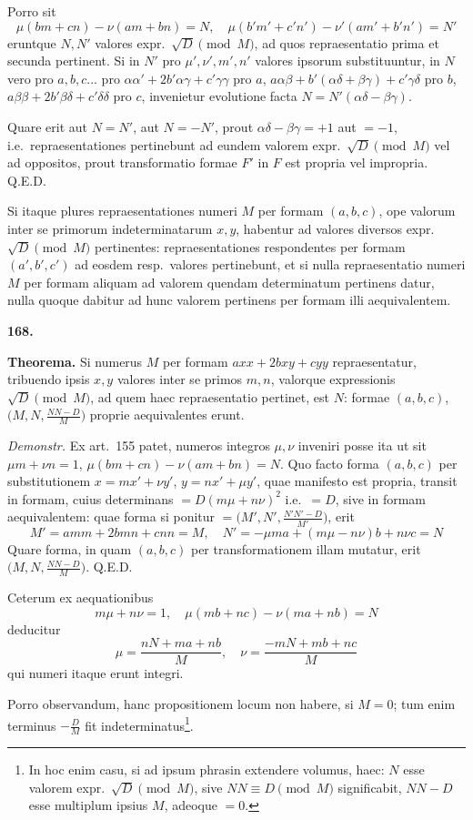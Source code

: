 \documentclass[12pt,a4paper]{article}
\theoremstyle{plain}
\theoremstyle{definition}
\theoremstyle{remark}
\newcommand{\qeode}{\textsc{Q.E.D.}}
\begin{document}
Porro sit
\[\mu(bm+cn)-\nu(am+bn)=N,\quad \mu(b'm'+c'n')-\nu'(am'+b'n')=N'\]
eruntque $N,N'$ valores expr.\ $\sqrt{D}\pmod{M}$, ad quos repraesentatio prima et secunda pertinent. Si in $N'$ pro $\mu',\nu',m',n'$ valores ipsorum substituuntur, in $N$ vero pro $a,b,c$...
pro $\alpha\alpha'+2b'\alpha\gamma+c'\gamma\gamma$ pro $a$, $a\alpha\beta+b'(\alpha\delta+\beta\gamma)+c'\gamma\delta$ pro $b$, $a\beta\beta+2b'\beta\delta+c'\delta\delta$ pro $c$, invenietur evolutione facta $N=N'(\alpha\delta-\beta\gamma)$.

Quare erit aut $N=N'$, aut $N=-N'$, prout $\alpha\delta-\beta\gamma=+1$ aut $=-1$, i.e.\ repraesentationes pertinebunt ad eundem valorem expr.\ $\sqrt{D}\pmod{M}$ vel ad oppositos, prout transformatio formae $F'$ in $F$ est propria vel impropria. \qeode

Si itaque plures repraesentationes numeri $M$ per formam $(a,b,c)$, ope valorum inter se primorum indeterminatarum $x,y$, habentur ad valores diversos expr.\ $\sqrt{D}\pmod{M}$ pertinentes: repraesentationes respondentes per formam $(a',b',c')$ ad eosdem resp.\ valores pertinebunt, et si nulla repraesentatio numeri $M$ per formam aliquam ad valorem quendam determinatum pertinens datur, nulla quoque dabitur ad hunc valorem pertinens per formam illi aequivalentem.

\textbf{168.}

\textbf{Theorema.} Si numerus $M$ per formam $axx+2bxy+cyy$ repraesentatur, tribuendo ipsis $x,y$ valores inter se primos $m,n$, valorque expressionis $\sqrt{D}\pmod{M}$, ad quem haec repraesentatio pertinet, est $N$: formae $(a,b,c)$, $\bigl(M,N,\frac{NN-D}{M}\bigr)$ proprie aequivalentes erunt.

\textit{Demonstr.} Ex art.\ 155 patet, numeros integros $\mu,\nu$ inveniri posse ita ut sit $\mu m+\nu n=1$, $\mu(bm+cn)-\nu(am+bn)=N$. Quo facto forma $(a,b,c)$ per substitutionem $x=mx'+\nu y'$, $y=nx'+\mu y'$, quae manifesto est propria, transit in formam, cuius determinans $=D(m\mu+n\nu)^2$ i.e.\ $=D$, sive in formam aequivalentem: quae forma si ponitur $=\bigl(M',N',\frac{N'N'-D}{M'}\bigr)$, erit
\[M'=amm+2bmn+cnn=M,\quad N'=-\mu ma+(m\mu-n\nu)b+n\nu c=N\]
Quare forma, in quam $(a,b,c)$ per transformationem illam mutatur, erit $\bigl(M,N,\frac{NN-D}{M}\bigr)$. \qeode

Ceterum ex aequationibus
\[m\mu+n\nu=1,\quad \mu(mb+nc)-\nu(ma+nb)=N\]
deducitur
\[\mu=\frac{nN+ma+nb}{M},\quad \nu=\frac{-mN+mb+nc}{M}\]
qui numeri itaque erunt integri.

Porro observandum, hanc propositionem locum non habere, si $M=0$; tum enim terminus $-\frac{D}{M}$ fit indeterminatus\footnote{In hoc enim casu, si ad ipsum phrasin extendere volumus, haec: $N$ esse valorem expr.\ $\sqrt{D}\pmod{M}$, sive $NN\equiv D\pmod{M}$ significabit, $NN-D$ esse multiplum ipsius $M$, adeoque $=0$.}.
\end{document}
